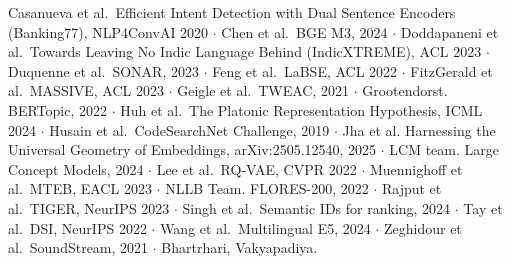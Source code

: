 \documentclass[
  10pt,
]{article}
\begin{document}
Casanueva et al.~Efficient Intent Detection with Dual Sentence Encoders
(Banking77), NLP4ConvAI 2020 $\cdot$ Chen et al.~BGE M3, 2024 $\cdot$ Doddapaneni et
al.~Towards Leaving No Indic Language Behind (IndicXTREME), ACL 2023 $\cdot$
Duquenne et al.~SONAR, 2023 $\cdot$ Feng et al.~LaBSE, ACL 2022 $\cdot$ FitzGerald
et al.~MASSIVE, ACL 2023 $\cdot$ Geigle et al.~TWEAC, 2021 $\cdot$ Grootendorst.
BERTopic, 2022 $\cdot$ Huh et al.~The Platonic Representation Hypothesis, ICML
2024 $\cdot$ Husain et al.~CodeSearchNet Challenge, 2019 $\cdot$ Jha et al.
Harnessing the Universal Geometry of Embeddings, arXiv:2505.12540, 2025
$\cdot$ LCM team. Large Concept Models, 2024 $\cdot$ Lee et al.~RQ-VAE, CVPR 2022 $\cdot$
Muennighoff et al.~MTEB, EACL 2023 $\cdot$ NLLB Team. FLORES-200, 2022 $\cdot$
Rajput et al.~TIGER, NeurIPS 2023 $\cdot$ Singh et al.~Semantic IDs for
ranking, 2024 $\cdot$ Tay et al.~DSI, NeurIPS 2022 $\cdot$ Wang et al.~Multilingual
E5, 2024 $\cdot$ Zeghidour et al.~SoundStream, 2021 $\cdot$ Bhartrhari, Vakyapadiya.
\end{document}
